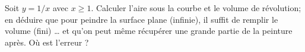 \begin{exercice}\label{exoInter0016}

Soit $y = 1/x$ avec $x \geq 1$. Calculer l'aire sous la courbe et le volume de révolution; en déduire que pour peindre la surface plane (infinie), il suffit  de remplir le volume (fini) \ldots{} et qu'on peut même récupérer une grande partie de la peinture après. Où est l'erreur ?

\end{exercice}
